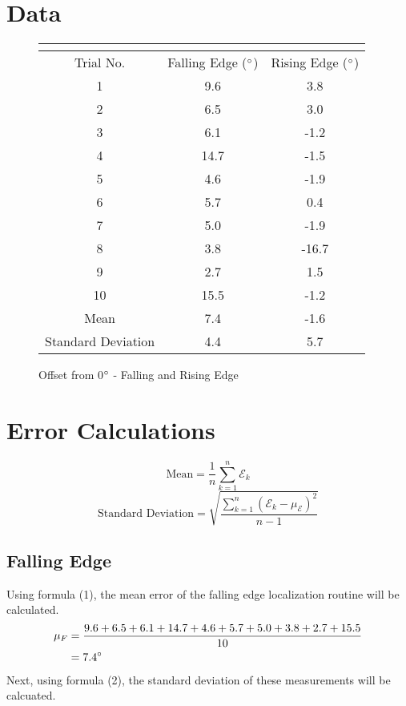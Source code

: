 \documentclass[11pt]{article}
\begin{document}
\section{Data}
\begin{figure}[h!t]
\begin{center}
\caption{Offset from 0$\degree$ - Falling and Rising Edge}
\begin{tabular}{| c | c | c |}
\multicolumn{3}{c}{} \\ \hline
Trial No. & Falling Edge ($\degree$) & Rising Edge ($\degree$) \\ \hline
1 & 9.6 & 3.8 \\ \hline
2 & 6.5 & 3.0 \\ \hline
3 & 6.1 & -1.2 \\ \hline
4 & 14.7 & -1.5 \\ \hline
5 & 4.6 & -1.9 \\ \hline
6 & 5.7 & 0.4 \\ \hline
7 & 5.0 & -1.9 \\ \hline
8 & 3.8 & -16.7 \\ \hline
9 & 2.7 & 1.5 \\ \hline
10 & 15.5 & -1.2 \\ \hline
Mean & 7.4 & -1.6 \\\hline
Standard Deviation & 4.4 & 5.7 \\ \hline
\end{tabular}
\end{center}
\end{figure}
\section{Error Calculations}
\begin{equation}
	\mbox{Mean} = \frac{1}{n} \sum_{k=1}^{n}\mathcal{E}_k
\end{equation}
\begin{equation}
	\mbox{Standard Deviation} = \sqrt{\frac{\sum_{k=1}^{n}(\mathcal{E}_k-\mu_{\mathcal{E}})^2}{n-1}}
\end{equation}
\subsection{Falling Edge}
Using formula (1), the mean error of the falling edge localization routine will be calculated.
\begin{equation*}
	\begin{aligned}
		\mu_F &= \dfrac{9.6+6.5+6.1+14.7+4.6+5.7+5.0+3.8+2.7+15.5}{10} \\
		&= 7.4 \degree
	\end{aligned}
\end{equation*}
Next, using formula (2), the standard deviation of these measurements will be calcuated.\\
\end{document}
